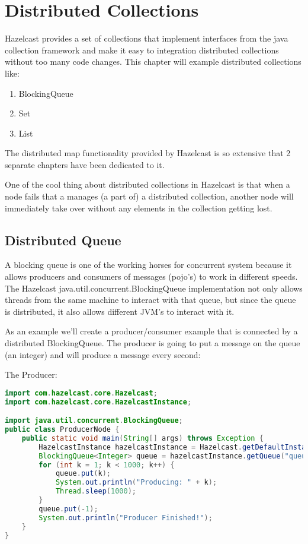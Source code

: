 \chapter{Distributed Collections}

Hazelcast provides a set of collections that implement interfaces from the java collection framework and make it easy to integration distributed collections without too many code changes. This chapter will example distributed collections like:
\begin{enumerate}
\item BlockingQueue
\item Set
\item List
\end{enumerate}
The distributed map functionality provided by Hazelcast is so extensive that 2 separate chapters have been dedicated to it. 

One of the cool thing about distributed collections in Hazelcast is that when a node fails that a manages (a part of) a distributed collection, another node will immediately take over without any elements in the collection getting lost.

\section{Distributed Queue}

A blocking queue is one of the working horses for concurrent system because it allows producers and consumers of messages (pojo's) to work in different speeds. The Hazelcast java.util.concurrent.BlockingQueue implementation not only allows threads from the same machine to interact with that queue, but since the queue is distributed, it also allows different JVM's to interact with it.

As an example we'll create a producer/consumer example that is connected by a distributed BlockingQueue. The producer is going to put a message on the queue (an integer) and will produce a message every second:

The Producer:
\begin{lstlisting}[language=java]
import com.hazelcast.core.Hazelcast;
import com.hazelcast.core.HazelcastInstance;

import java.util.concurrent.BlockingQueue;
public class ProducerNode {
    public static void main(String[] args) throws Exception {
        HazelcastInstance hazelcastInstance = Hazelcast.getDefaultInstance();
        BlockingQueue<Integer> queue = hazelcastInstance.getQueue("queue");
        for (int k = 1; k < 1000; k++) {
            queue.put(k);
            System.out.println("Producing: " + k);
            Thread.sleep(1000);
        }
        queue.put(-1);
        System.out.println("Producer Finished!");
    }
}
\end{lstlisting}

